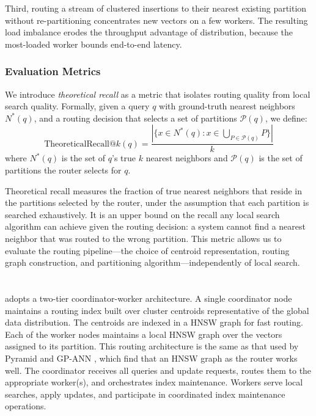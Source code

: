\documentclass[sigconf,review,anonymous]{acmart}
\begin{document}
    Third, routing a stream of clustered insertions to their nearest existing partition without re-partitioning concentrates new vectors on a few workers. The resulting load imbalance erodes the throughput advantage of distribution, because the most-loaded worker bounds end-to-end latency.


    \subsubsection{Evaluation Metrics}
    \label{sec:eval-metrics}

    We introduce \textit{theoretical recall} as a metric that isolates routing quality from local search quality. Formally, given a query $q$ with ground-truth nearest neighbors $N^*(q)$, and a routing decision that selects a set of partitions $\mathcal{P}(q)$, we define:  
    \[
    \text{TheoreticalRecall}@k(q) = \frac{|\{x \in N^*(q) : x \in \bigcup_{P \in \mathcal{P}(q)} P\}|}{k}
    \]
    where $N^*(q)$ is the set of $q$'s true $k$ nearest neighbors and $\mathcal{P}(q)$ is the set of partitions the router selects for $q$.

    Theoretical recall measures the fraction of true nearest neighbors that reside in the partitions selected by the router, under the assumption that each partition is searched exhaustively. It is an upper bound on the recall any local search algorithm can achieve given the routing decision: a system cannot find a nearest neighbor that was routed to the wrong partition. This metric allows us to evaluate the routing pipeline---the choice of centroid representation, routing graph construction, and partitioning algorithm---independently of local search.

\section{\SystemName{}}
    \SystemName{} adopts a two-tier  coordinator-worker architecture. A single coordinator node maintains a routing index built over cluster centroids representative of the global data distribution. The centroids are indexed in a HNSW graph for fast routing. Each of the worker nodes maintains a local HNSW graph over the vectors assigned to its partition. This routing architecture is the same as that used by Pyramid \cite{deng2019pyramid} and GP-ANN \cite{gottesbueren2025unleashing}, which find that an HNSW graph as the router works well. The coordinator receives all queries and update requests, routes them to the appropriate worker(s), and orchestrates index maintenance. Workers serve local searches, apply updates, and participate in coordinated index maintenance operations.
\end{document}
